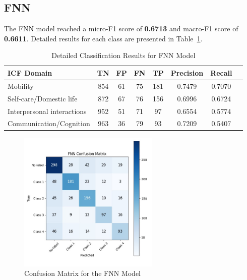 \vspace{1em} 
\subsection{FNN}

The FNN model reached a micro-F1 score of \textbf{0.6713} and macro-F1 score of \textbf{0.6611}. Detailed results for each class are presented in Table~\ref{tab:fnn-results}.

\begin{table}[H]
\centering
\caption{Detailed Classification Results for FNN Model}
\label{tab:fnn-results}
\begin{tabular}{lccccccc}
\toprule
\textbf{ICF Domain} & \textbf{TN} & \textbf{FP} & \textbf{FN} & \textbf{TP} & \textbf{Precision} & \textbf{Recall} \\ 
\midrule
Mobility & 854 & 61 & 75 & 181 & 0.7479 & 0.7070 \\
Self-care/Domestic life & 872 & 67 & 76 & 156 & 0.6996 & 0.6724 \\
Interpersonal interactions & 952 & 51 & 71 & 97 & 0.6554 & 0.5774 \\
Communication/Cognition & 963 & 36 & 79 & 93 & 0.7209 & 0.5407 \\
\bottomrule
\end{tabular}
\end{table}

\begin{figure}[H]
\centering
\includegraphics[width=0.6\textwidth]{images/Supervised_Results/FNN_confusion_matrix.jpg}
\caption{Confusion Matrix for the FNN Model}
\label{fig:fnn-confusion}
\end{figure}

